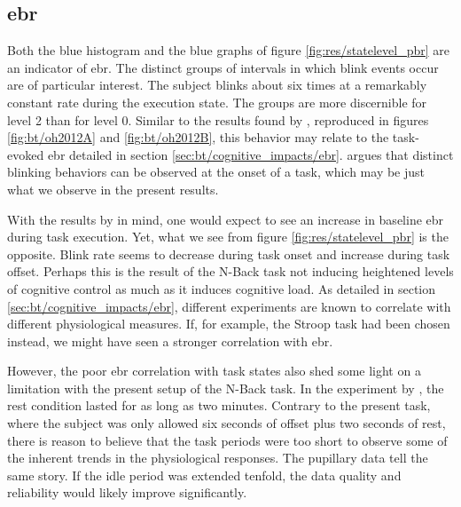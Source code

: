 % 

\subsection{\acrlong{ebr}} \label{sec:disc/ocular_correlations/ebr}

Both the blue histogram and the blue graphs of figure \ref{fig:res/statelevel_pbr} are an indicator of \acrshort{ebr}. The distinct groups of intervals in which blink events occur are of particular interest. The subject blinks about six times at a remarkably constant rate during the execution state. The groups are more discernible for level 2 than for level 0. Similar to the results found by \textcite{oh2012}, reproduced in figures \ref{fig:bt/oh2012A} and \ref{fig:bt/oh2012B}, this behavior may relate to the task-evoked \acrshort{ebr} detailed in section \ref{sec:bt/cognitive_impacts/ebr}. \textcite{oh2012} argues that distinct blinking behaviors can be observed at the onset of a task, which may be just what we observe in the present results.

With the results by \textcite{oh2012} in mind, one would expect to see an increase in baseline \acrshort{ebr} during task execution. Yet, what we see from figure \ref{fig:res/statelevel_pbr} is the opposite. Blink rate seems to decrease during task onset and increase during task offset. Perhaps this is the result of the N-Back task not inducing heightened levels of cognitive control as much as it induces cognitive load. As detailed in section \ref{sec:bt/cognitive_impacts/ebr}, different experiments are known to correlate with different physiological measures. If, for example, the Stroop task had been chosen instead, we might have seen a stronger correlation with \acrshort{ebr}.

However, the poor \acrshort{ebr} correlation with task states also shed some light on a limitation with the present setup of the N-Back task. In the experiment by \textcite{oh2012}, the rest condition lasted for as long as two minutes. Contrary to the present task, where the subject was only allowed six seconds of offset plus two seconds of rest, there is reason to believe that the task periods were too short to observe some of the inherent trends in the physiological responses. The pupillary data tell the same story. If the idle period was extended tenfold, the data quality and reliability would likely improve significantly.

